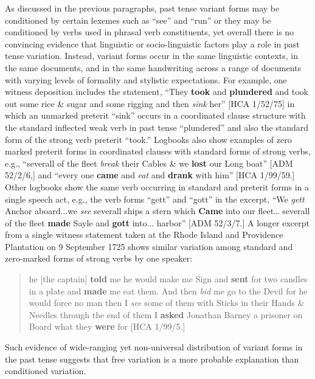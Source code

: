 \documentclass[12pt]{article}
\newenvironment{styleStandard}{\renewcommand\baselinestretch{1.0}\setlength\leftskip{0cm}\setlength\rightskip{0cm plus 1fil}\setlength\parindent{0cm}\setlength\parfillskip{0pt plus 1fil}\setlength\parskip{0in plus 1pt}\writerlistparindent\writerlistleftskip\leavevmode\normalfont\normalsize\writerlistlabel\ignorespaces}{\unskip\vspace{0in plus 1pt}\par}
\newcommand\writerlistleftskip{}
\newcommand\writerlistparindent{}
\newcommand\writerlistlabel{}
\begin{document}
\begin{styleStandard}
As discussed in the previous paragraphs, past tense variant forms may be conditioned by certain lexemes such as “see” and “run” or they may be conditioned by verbs used in phrasal verb constituents, yet overall there is no convincing evidence that linguistic or socio-linguistic factors play a role in past tense variation. Instead, variant forms occur in the same linguistic contexts, in the same documents, and in the same handwriting across a range of documents with varying levels of formality and stylistic expectations. For example, one witness deposition includes the statement, “They \textbf{took }and \textbf{plundered} and took out some rice \& sugar and some rigging and then \textit{sink} her” [HCA 1/52/75] in which an unmarked preterit “sink” occurs in a coordinated clause structure with the standard inflected weak verb in past tense “plundered” and also the standard form of the strong verb preterit “took.” Logbooks also show examples of zero marked preterit forms in coordinated clauses with standard forms of strong verbs, e.g., “severall of the fleet \textit{break} their Cables \& we\textbf{ lost} our Long boat” [ADM 52/2/6,] and “every one \textbf{came} and \textit{eat} and \textbf{drank} with him” [HCA 1/99/59.] Other logbooks show the same verb occurring in standard and preterit forms in a single speech act, e.g., the verb forms “gett” and “gott” in the excerpt, “We \textit{gett }Anchor aboard...we \textit{see} severall ships a stern which \textbf{Came} into our fleet… severall of the fleet \textbf{made} Sayle and \textbf{gott} into... harbor” [ADM 52/3/7.] A longer excerpt from a single witness statement taken at the Rhode Island and Providence Plantation on 9 September 1725 shows similar variation among standard and zero-marked forms of strong verbs by one speaker:
\end{styleStandard}


\begin{quotation}
he [the captain] \textbf{told} me he would make me Sign and \textbf{sent} for two candles in a plate and \textbf{made} me eat them. And then\textit{ bid} me go to the Devil for he would force no man then I\textit{ see} some of them with Sticks in their Hands \& Needles through the end of them I \textbf{asked} Jonathan Barney a prisoner on Board what they \textbf{were} for [HCA 1/99/5.]

\end{quotation}
\begin{styleStandard}
Such evidence of wide-ranging yet non-universal distribution of variant forms in the past tense suggests that free variation is a more probable explanation than conditioned variation.
\end{styleStandard}
\end{document}
